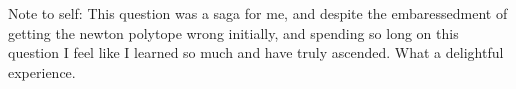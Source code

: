 \documentclass[12pt,letterpaper,boxed]{hmcpset}
\begin{document}
\begin{solution}
\begin{itemize}
Note to self: 
This question was a saga for me, and despite the embaressedment of getting the newton
polytope wrong initially, and spending so long on this question
I feel like I learned so much and have truly
ascended. What a delightful experience.

\end{itemize}
\end{solution}

\newpage
\end{document}
